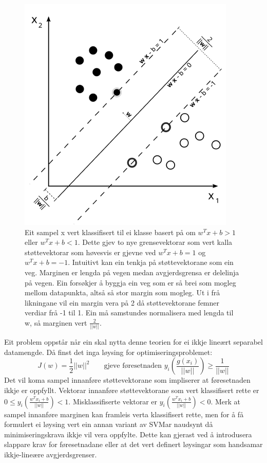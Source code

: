 \documentclass[oneside, nynorsk]{book}
\begin{document}
\begin{figure}[h!]
    \centering
    \centerline{\includegraphics[width=0.6\linewidth]{SVMbilete}}
    \caption{Eit sampel x vert klassifisert til ei klasse basert på om $w^Tx + b>1$ eller $w^Tx + b<1$. Dette gjev to nye grensevektorar som vert kalla støttevektorar
    som høvesvis er gjevne ved $w^Tx + b=1$ og $w^Tx + b=-1$.
    Intuitivt kan ein tenkja på støttevektorane som ein veg. Marginen er lengda på vegen medan avgjerdsgrensa er delelinja på vegen.
    Ein forsøkjer å byggja ein veg som er så brei som mogleg mellom datapunkta, altså så stor margin som mogleg.
    Ut i frå likningane vil ein margin vera på 2 då støttevektorane femner verdiar frå -1 til 1. Ein må samstundes normalisera med lengda til w, så marginen vert
    $\frac{2}{||w||}$.}
    \label{SVMbilete}
\end{figure}

Eit problem oppstår når ein skal nytta denne teorien for ei ikkje lineært separabel datamengde.
Då finst det inga løysing for optimiseringsproblemet:
\[J(w)=\frac{1}{2}||w||^2 \qquad \text{gjeve føresetnaden $y_i(\frac{g(x_i)}{||w||})\geq \frac{1}{||w||}$}\]
Det vil koma sampel innanføre støttevektorane som impliserer at føresetnaden ikkje er oppfyllt.
Vektorar innanføre støttevektorane som vert klassifisert rette er $0\leq y_i(\frac{w^Tx_i+b}{||w||}) < 1$.
Misklassifiserte vektorar er $y_i(\frac{w^Tx_i+b}{||w||}) < 0$.
Merk at sampel innanføre marginen kan framleis verta klassifisert rette,
men for å få formulert ei løysing vert ein annan variant av SVMar naudsynt då minimiseringskrava ikkje vil vera oppfylte.
Dette kan gjerast ved å introdusera slappare krav for føresetnadane eller at det vert definert løysingar som handsamar ikkje-lineære avgjerdsgrenser.
\end{document}
